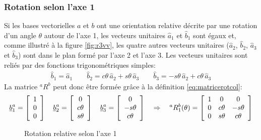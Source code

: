 \subsubsection{Rotation selon l'axe 1}
%
Si les bases vectorielles $a$ et $b$ ont une orientation relative décrite par une rotation d'un angle $\theta$ autour de l'axe 1, les vecteurs unitaires $\hat{a}_1$ et $\hat{b}_1$ sont égaux et, comme illustré à la figure \ref{fig:r3vv}, les quatre autres vecteurs unitaires ($\hat{a}_2$, $\hat{b}_2$, $\hat{a}_3$ et $\hat{b}_3$) sont dans le plan formé par l'axe 2 et l'axe 3. Les vecteurs unitaires sont reliés par des fonctions trigonométriques simples: 
\begin{align}
\hat{b}_1 = \hat{a}_1 \quad\quad
\hat{b}_2 = c\theta \, \hat{a}_2 + s\theta \, \hat{a}_3 \quad\quad
\hat{b}_3 = -s\theta \, \hat{a}_2 + c\theta \, \hat{a}_3
\label{eq:rot1vecuni}
\end{align}
La matrice $^aR^b$ peut donc être formée grâce à la définition \eqref{eq:matricerotcol}:
\begin{align}
\underline{b}_1^a = \left[ \begin{array}{c} 1 \\ 0 \\ 0  \end{array} \right] \quad
\underline{b}_2^a = \left[ \begin{array}{c} 0 \\ c\theta \\ s\theta  \end{array} \right] \quad
\underline{b}_3^a = \left[ \begin{array}{c} 0 \\ -s\theta \\ c\theta  \end{array} \right]
\quad \Rightarrow \quad
^aR^b_1(\theta) 
= \left[ \begin{array}{c c c}
	1 & 0 & 0 \\
	0 & c\theta  & -s\theta \\
	0 & s\theta & c\theta 
\end{array}  \right]
\label{eq:rot1theta}
\end{align}
%
\begin{figure}[H]
        \centering
				\hspace{+20pt}
        \caption{Rotation relative selon l'axe 1}
				\label{fig:r1vv}
\end{figure}



